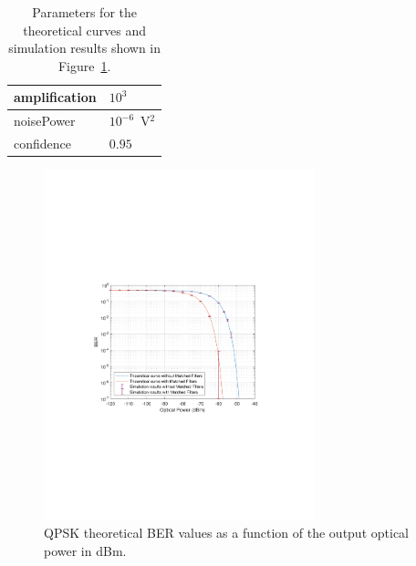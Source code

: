 \begin{refsection}
\begin{table}[H]
\begin{tabular}{|l|l|}
		amplification          & $10^3$                                                     \\ \hline
		noisePower			   & $10^{-6}$~V$^2$                             					\\ \hline
		confidence             & $0.95$                                                     \\ \hline
	\end{tabular}
	\caption{Parameters for the theoretical curves and simulation results shown in Figure~\ref{fig:ber_pseudorandom}.\label{tab:ber_pseudorandom}}
\end{table}

\begin{figure}[H]
	\centering
		\includegraphics[clip, trim=4cm 8cm 4cm 8cm, width=0.7\textwidth]{./sdf/m_qam_system/figures/teor_vs_simul.pdf}
\caption{QPSK theoretical BER values as a function of the output optical power in dBm.\label{fig:ber_pseudorandom}}
\end{figure}



\end{refsection}
